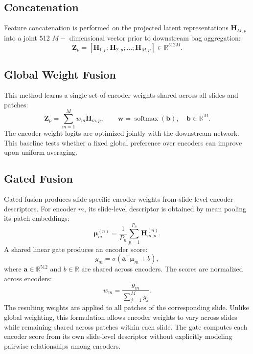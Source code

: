 \subsection{Concatenation}
Feature concatenation is performed on the projected latent representations $\mathbf{H}_{M,p}$ into a joint 512 $M-$ dimensional vector prior to downstream bag aggregation:
\begin{equation}
\mathbf{Z}_p =
[\mathbf{H}_{1,p};\mathbf{H}_{2,p};\ldots;\mathbf{H}_{M,p}]
\in\mathbb{R}^{512M}.
\end{equation}

\subsection{Global Weight Fusion}
This method learns a single set of encoder weights shared across all slides and patches:
\begin{equation}
\mathbf{Z}_p =
\sum_{m=1}^{M}w_m\mathbf{H}_{m,p},
\qquad
\mathbf{w}=\operatorname{softmax}(\mathbf{b}),
\quad
\mathbf{b}\in\mathbb{R}^{M}.
\end{equation}
The encoder-weight logits are optimized jointly with the downstream network.
This baseline tests whether a fixed global preference over encoders can improve upon uniform averaging.

\subsection{Gated Fusion}
Gated fusion produces slide-specific encoder weights from slide-level encoder descriptors.
For encoder $m$, its slide-level descriptor is obtained by mean pooling its patch embeddings:
\begin{equation}
\mathbf{\mu}_m^{(n)}
=
\frac{1}{P_n}
\sum_{p=1}^{P_n}\mathbf{H}_{m,p}^{(n)}.
\end{equation}
A shared linear gate produces an encoder score:
\begin{equation}
g_m
=
\sigma\left(
\mathbf{a}^{\top}\mathbf{\mu}_m+b
\right),
\end{equation}
where $\mathbf{a}\in\mathbb{R}^{512}$ and $b\in\mathbb{R}$ are shared across encoders.
The scores are normalized across encoders:
\begin{equation}
w_m
=
\frac{g_m}
{\sum_{j=1}^{M}g_j}.
\end{equation}
The resulting weights are applied to all patches of the corresponding slide.
Unlike global weighting, this formulation allows encoder weights to vary across slides while remaining shared across patches within each slide.
The gate computes each encoder score from its own slide-level descriptor without explicitly modeling pairwise relationships among encoders.

